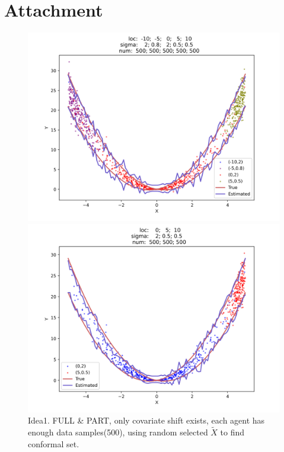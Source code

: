 \documentclass[12pt, a4paper, oneside]{article}
\begin{document}
\section{Attachment}
    \begin{figure}[htbp]
        \centering
        \begin{minipage}{0.495\linewidth}
            \centering
            \includegraphics[width=0.98\linewidth]{fig/Ex1_1/FULL.png}
        \end{minipage}
        \begin{minipage}{0.495\linewidth}
            \centering
            \includegraphics[width=0.98\linewidth]{fig/Ex1_1/PART.png}
        \end{minipage}
        \caption{Idea1. FULL \& PART, only covariate shift exists, each agent has enough data samples(500), using random selected $\tilde{X}$ to find conformal set.}
        \label{Fig1}
    \end{figure}
\end{document}
